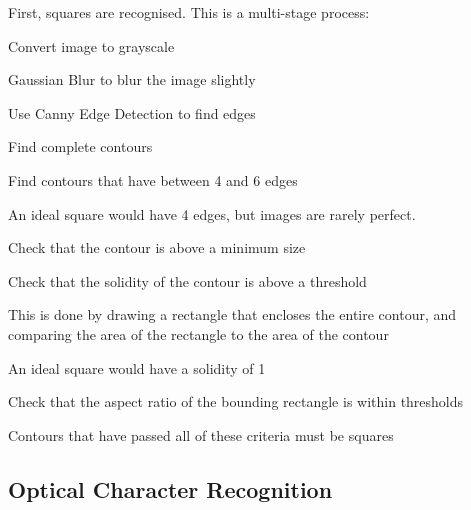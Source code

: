 \documentclass[10pt]{article}
\begin{document}
First, squares are recognised. This is a multi-stage process:
\begin{compactenum}
    \item Convert image to grayscale
    \item Gaussian Blur to blur the image slightly
    \item Use Canny Edge Detection to find edges
    \item Find complete contours
    \item Find contours that have between 4 and 6 edges
    \begin{compactitem}
        \item \small An ideal square would have 4 edges, but images are rarely perfect.
    \end{compactitem}
    \item Check that the contour is above a minimum size
    \item Check that the solidity of the contour is above a threshold
    \begin{compactitem}
        \item This is done by drawing a rectangle that encloses the entire contour, and comparing the area of the rectangle to the area of the contour
        \item An ideal square would have a solidity of 1
    \end{compactitem}
    \item Check that the aspect ratio of the bounding rectangle is within thresholds
    \item Contours that have passed all of these criteria must be squares
\end{compactenum}

\subsection{Optical Character Recognition}


\newpage
\appendix
\end{document}

